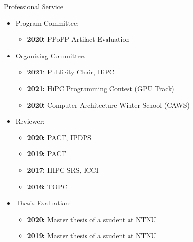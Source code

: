 \documentclass{resume} %
\begin{document}


\begin{rSection}{Professional Service}

\begin{itemize}
\item Program Committee:
\begin{itemize}
	\item \textbf{2020:} PPoPP  Artifact Evaluation
\end{itemize}
\item Organizing Committee:
\begin{itemize}
	\item \textbf{2021:} Publicity Chair, HiPC
	\item \textbf{2021:} HiPC Programming Contest (GPU Track)
	\item \textbf{2020:} Computer Architecture Winter School (CAWS)
\end{itemize}
\item Reviewer:
\begin{itemize}
	\item \textbf{2020:} PACT, IPDPS
	\item \textbf{2019:} PACT 
	\item \textbf{2017:} HIPC SRS, ICCI 
	\item \textbf{2016:} TOPC
\end{itemize}
\item Thesis Evaluation:
\begin{itemize}
	\item \textbf{2020:} Master thesis of a student at NTNU 
	\item \textbf{2019:} Master thesis of a student at NTNU
\end{itemize}
\end{itemize}
\end{rSection}




\end{document}
